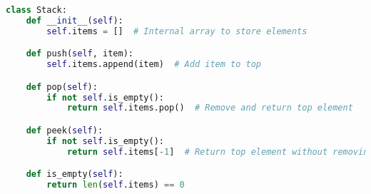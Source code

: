 \begin{algo}
\begin{lstlisting}[language=Python]
class Stack:
    def __init__(self):
        self.items = []  # Internal array to store elements

    def push(self, item):
        self.items.append(item)  # Add item to top

    def pop(self):
        if not self.is_empty():
            return self.items.pop()  # Remove and return top element

    def peek(self):
        if not self.is_empty():
            return self.items[-1]  # Return top element without removing

    def is_empty(self):
        return len(self.items) == 0
\end{lstlisting}
\end{algo}
\newpage

